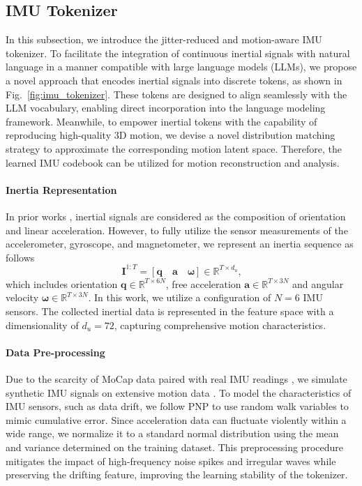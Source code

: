 \subsection{IMU Tokenizer}
\label{sec:imu_vq}
In this subsection, we introduce the jitter-reduced and motion-aware IMU tokenizer. To facilitate the integration of continuous inertial signals with natural language in a manner compatible with large language models (LLMs), we propose a novel approach that encodes inertial signals into discrete tokens, as shown in Fig.~\ref{fig:imu_tokenizer}. These tokens are designed to align seamlessly with the LLM vocabulary, enabling direct incorporation into the language modeling framework. Meanwhile, to empower inertial tokens with the capability of reproducing high-quality 3D motion, we devise a novel distribution matching strategy to approximate the corresponding motion latent space. Therefore, the learned IMU codebook can be utilized for motion reconstruction and analysis.

\vspace{-4mm}
\paragraph{Inertia Representation} In prior works \cite{huang2018DIP,TransPoseSIGGRAPH2021,TIP22,PIPCVPR2022,yi2024pnp}, inertial signals are considered as the composition of orientation and linear acceleration. However, to fully utilize the sensor measurements of the accelerometer, gyroscope, and magnetometer, we represent an inertia sequence as follows
\begin{equation}
    \mathbf I^{1:T} = [\mathbf{q} \quad \mathbf{a} \quad \bm{\omega}] \in\mathbb R^{T\times d_u}\text{,}
\label{eq:inertia_representation}
\end{equation}
which includes orientation $\mathbf q\in\mathbb R^{T\times 6N}$, free acceleration $\mathbf a\in\mathbb R^{T\times 3N}$ and angular velocity $\bm{\omega} \in \mathbb{R}^{T\times 3N}$. In this work, we utilize a configuration of $N=6$ IMU sensors. The collected inertial data is represented in the feature space with a dimensionality of $d_u=72$, capturing comprehensive motion characteristics.

\vspace{-4mm}
\paragraph{Data Pre-processing} Due to the scarcity of MoCap data paired with real IMU readings \cite{huang2018DIP,trumble2017total,dai2024hmd}, we simulate synthetic IMU signals on extensive motion data \cite{huang2018DIP,TransPoseSIGGRAPH2021}. To model the characteristics of IMU sensors, such as data drift, we follow PNP \cite{yi2024pnp} to use random walk variables to mimic cumulative error. Since acceleration data can fluctuate violently within a wide range, we normalize it to a standard normal distribution using the mean and variance determined on the training dataset. This preprocessing procedure mitigates the impact of high-frequency noise spikes and irregular waves while preserving the drifting feature, improving the learning stability of the tokenizer.

